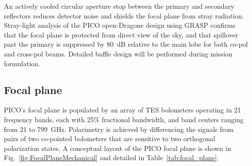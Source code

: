 An actively cooled circular aperture stop between the primary and secondary reflectors reduces detector noise and shields the focal plane from stray radiation. Stray-light analysis of the PICO open-Dragone design using GRASP confirms that the focal plane is protected from direct view of the sky, and that spillover past the primary is suppressed by 80~dB relative to the main lobe for both co-pol and cross-pol beams. Detailed baffle design will be performed during mission formulation.



\subsection{Focal plane}
\label{sec:focal_plane} %

PICO's focal plane is populated by an %
array of \ac{TES} bolometers operating in 21 %
frequency bands, each with 25\% fractional bandwidth, and band centers ranging from 21 to 799~GHz.
Polarimetry is achieved by differencing the signals from pairs of two co-pointed bolometers that are sensitive to two orthogonal polarization states. %
A conceptual layout of the PICO focal plane is shown in Fig.~\ref{fig:FocalPlaneMechanical} and detailed in Table~\ref{tab:focal_plane}.

